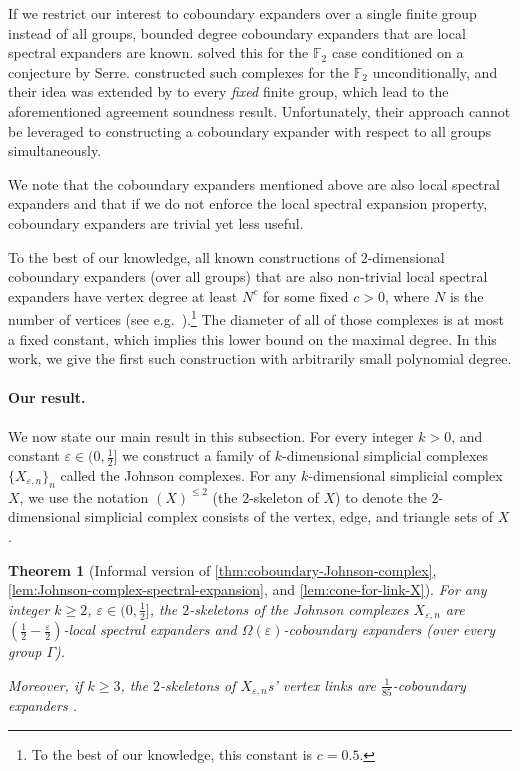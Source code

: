 \documentclass[10pt,a4paper]{article}
\newcommand{\prettyref}[1]{\cref{#1}}
\newtheorem{theorem}{Theorem}[section]
\theoremstyle{definition}
\theoremstyle{remark}
\newcommand{\Authornotecolored}[3]{{\sffamily\small\color{#1}{[#2: #3]}}}
\newcommand{\Authornotecolored}[3]{}
\newcommand{\Ynote}{\Authornotecolored{Purple}{Y}}
\newcommand{\F}{\mathbb{F}}
\renewcommand{\le}{\leqslant}
\renewcommand{\ge}{\geqslant}
\numberwithin{equation}{section}
\let\origparagraph\paragraph
\renewcommand{\paragraph}[1]{\origparagraph{#1.}}
\let\pref=\prettyref
\begin{document}
If we restrict our interest to coboundary expanders over a single finite group instead of all groups, bounded degree coboundary expanders that are local spectral expanders are known. \cite{KaufmanKL2016} solved this for the \(\F_2\) case conditioned on a conjecture by Serre. \cite{ChapmanL2023} constructed such complexes for the \(\F_2\) unconditionally, and their idea was extended by \cite{DiksteinDL2024,BafnaM2024} to every \emph{fixed} finite group, which lead to the aforementioned agreement soundness result. Unfortunately, their approach cannot be leveraged to constructing a coboundary expander with respect to all groups simultaneously.

 We note that the coboundary expanders mentioned above are also local spectral expanders and that if we do not enforce the local spectral expansion property, coboundary expanders are trivial yet less useful.
 
 \Ynote{Please make sure my footnote is correct}To the best of our knowledge, all known constructions of $2$-dimensional coboundary expanders (over all groups) that are also non-trivial local spectral expanders have vertex degree at least $N^{c}$ for some fixed $c>0$, where $N$ is the number of vertices (see e.g.\ \cite{LubotzkySV2005,kaufmanO2018}).\footnote{To the best of our knowledge, this constant is \(c=0.5\).} The diameter of all of those complexes is at most a fixed constant, which implies this lower bound on the maximal degree. In this work, we give the first such construction with arbitrarily small polynomial degree.

\paragraph{Our result} We now state our main result in this subsection. For every integer $k>0$, and constant $\varepsilon \in (0,\frac{1}{2}]$ we construct a family of $k$-dimensional simplicial complexes $\{X_{\varepsilon,n}\}_n$ called the Johnson complexes. For any $k$-dimensional simplicial complex $X$, we use the notation $(X)^{\le 2}$ (the $2$-skeleton of $X$) to denote the $2$-dimensional simplicial complex consists of the vertex, edge, and triangle sets of $X$.
\begin{theorem}[Informal version of \pref{thm:coboundary-Johnson-complex}, \pref{lem:Johnson-complex-spectral-expansion}, and \pref{lem:cone-for-link-X}] \label{thm:inf-Johnson-complex-expansions}
For any integer $k\ge 2$, $\varepsilon \in (0,\frac{1}{2}]$, the $2$-skeletons of the Johnson complexes $X_{\varepsilon,n}$ are $\left(\frac{1}{2} - \frac{\varepsilon}{2}\right)$-local spectral expanders and $\Omega(\varepsilon)$-coboundary expanders (over every group $\Gamma$).

Moreover, if $k\ge 3$, the $2$-skeletons of $X_{\varepsilon,n}$s' vertex links are $\frac{1}{85}$-coboundary expanders . 
\end{theorem}
\end{document}
